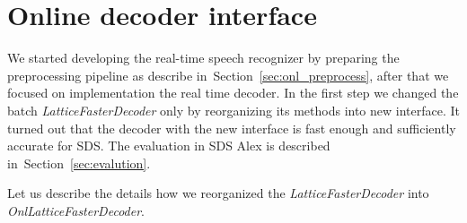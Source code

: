 \section{Online decoder interface} 
\label{sec:improve}
We started developing the real-time speech recognizer by preparing the preprocessing
pipeline as describe in~Section~\ref{sec:onl_preprocess}, after that we focused 
on implementation the real time decoder. In the first step we changed 
the batch {\it LatticeFasterDecoder}\/ only by reorganizing its methods into new interface.
It turned out that the decoder with the new interface is 
fast enough and sufficiently accurate for \ac{SDS}. 
The evaluation in \ac{SDS} Alex is described in~Section~\ref{sec:evalution}.

Let us describe the details how we reorganized the {\it LatticeFasterDecoder}\/ 
into {\it OnlLatticeFasterDecoder}.

